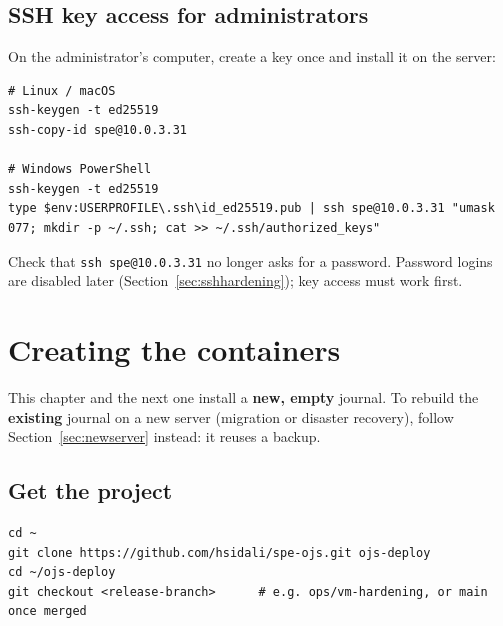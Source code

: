 \documentclass[11pt,a4paper]{report}
\newcommand{\code}[1]{\texttt{\small #1}}
\begin{document}
\section{SSH key access for administrators}
On the administrator's computer, create a key once and install it on the server:
\begin{lstlisting}
# Linux / macOS
ssh-keygen -t ed25519
ssh-copy-id spe@10.0.3.31

# Windows PowerShell
ssh-keygen -t ed25519
type $env:USERPROFILE\.ssh\id_ed25519.pub | ssh spe@10.0.3.31 "umask 077; mkdir -p ~/.ssh; cat >> ~/.ssh/authorized_keys"
\end{lstlisting}
Check that \code{ssh spe@10.0.3.31} no longer asks for a password. Password logins are disabled
later (Section~\ref{sec:sshhardening}); key access must work first.

\chapter{Creating the containers}\label{ch:containers}

\begin{note}
This chapter and the next one install a \textbf{new, empty} journal. To rebuild the
\textbf{existing} journal on a new server (migration or disaster recovery), follow
Section~\ref{sec:newserver} instead: it reuses a backup.
\end{note}

\section{Get the project}
\begin{lstlisting}
cd ~
git clone https://github.com/hsidali/spe-ojs.git ojs-deploy
cd ~/ojs-deploy
git checkout <release-branch>      # e.g. ops/vm-hardening, or main once merged
\end{lstlisting}
\end{document}
